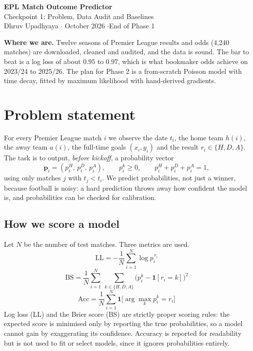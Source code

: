 \documentclass[12pt,a4paper]{article}
\begin{document}
\begin{center}
{\Huge\bfseries\color{accent} EPL Match Outcome Predictor}\\[0.6em]
{\Large Checkpoint 1: Problem, Data Audit and Baselines}\\[0.6em]
{\large Dhruv Upadhyaya \quad$\cdot$ October 2026 \quad$\cdot$\quad End of Phase 1}
\end{center}

\vspace{0.5em}

\begin{keybox}
\textbf{Where we are.} Twelve seasons of Premier League results and odds (4{,}240 matches) are
downloaded, cleaned and audited, and the data is sound. The bar to beat is a log loss of about
$0.95$ to $0.97$, which is what bookmaker odds achieve on 2023/24 to 2025/26. The plan
for Phase 2 is a from-scratch Poisson model with time decay, fitted by maximum likelihood with
hand-derived gradients.
\end{keybox}

\section{Problem statement}

For every Premier League match $i$ we observe the date $t_i$, the home team $h(i)$, the away team
$a(i)$, the full-time goals $(x_i,y_i)$ and the result $r_i\in\{H,D,A\}$. The task is to output,
\emph{before kickoff}, a probability vector
\[
\mathbf p_i=(p_i^{H},\,p_i^{D},\,p_i^{A}),\qquad p_i^{k}\ge 0,\qquad p_i^{H}+p_i^{D}+p_i^{A}=1,
\]
using only matches $j$ with $t_j<t_i$. We predict probabilities, not just a winner, because
football is noisy: a hard prediction throws away how confident the model is, and probabilities
can be checked for calibration.

\subsection{How we score a model}

Let $N$ be the number of test matches. Three metrics are used.
\[
\mathrm{LL}=-\frac{1}{N}\sum_{i=1}^{N}\log p_i^{\,r_i}
\]
\[
\mathrm{BS}=\frac{1}{N}\sum_{i=1}^{N}\ \sum_{k\in\{H,D,A\}}\bigl(p_i^{k}-\mathbf 1[r_i=k]\bigr)^{2}
\]
\[
\mathrm{Acc}=\frac{1}{N}\sum_{i=1}^{N}\mathbf 1\bigl[\arg\max_k p_i^{k}=r_i\bigr]
\]
Log loss (LL) and the Brier score (BS) are strictly proper scoring rules: the expected score is
minimised only by reporting the true probabilities, so a model cannot gain by exaggerating its
confidence. Accuracy is reported for readability but is not used to fit or select models, since it
ignores probabilities entirely.
\end{document}
